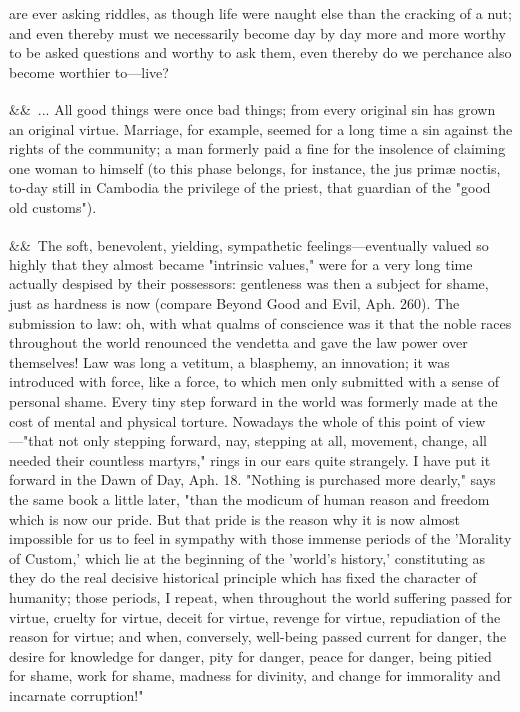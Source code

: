\documentclass[12pt]{article}
\newcommand{\para}[1][]{\par\noindent\ifx&#1&\else\textsuperscript{\footnotesize #1}~\fi}
\begin{document}
are ever asking riddles, as though life were naught else than the cracking of a nut; and even thereby must we necessarily become day by day more and more worthy to be asked questions and worthy to ask them, even thereby do we perchance also become worthier to---live?

\para ... All good things were once bad things; from every original sin has grown an original virtue. Marriage, for example, seemed for a long time a sin against the rights of the community; a man formerly paid a fine for the insolence of claiming one woman to himself (to this phase belongs, for instance, the jus primæ noctis, to-day still in Cambodia the privilege of the priest, that guardian of the "good old customs").

\para The soft, benevolent, yielding, sympathetic feelings---eventually valued so highly that they almost became "intrinsic values," were for a very long time actually despised by their possessors: gentleness was then a subject for shame, just as hardness is now (compare Beyond Good and Evil, Aph. 260). The submission to law: oh, with what qualms of conscience was it that the noble races throughout the world renounced the vendetta and gave the law power over themselves! Law was long a vetitum, a blasphemy, an innovation; it was introduced with force, like a force, to which men only submitted with a sense of personal shame. Every tiny step forward in the world was formerly made at the cost of mental and physical torture. Nowadays the whole of this point of view---"that not only stepping forward, nay, stepping at all, movement, change, all needed their countless martyrs," rings in our ears quite strangely. I have put it forward in the Dawn of Day, Aph. 18. "Nothing is purchased more dearly," says the same book a little later, "than the modicum of human reason and freedom which is now our pride. But that pride is the reason why it is now almost impossible for us to feel in sympathy with those immense periods of the 'Morality of Custom,' which lie at the beginning of the 'world's history,' constituting as they do the real decisive historical principle which has fixed the character of humanity; those periods, I repeat, when throughout the world suffering passed for virtue, cruelty for virtue, deceit for virtue, revenge for virtue, repudiation of the reason for virtue; and when, conversely, well-being passed current for danger, the desire for knowledge for danger, pity for danger, peace for danger, being pitied for shame, work for shame, madness for divinity, and change for immorality and incarnate corruption!"
\end{document}
